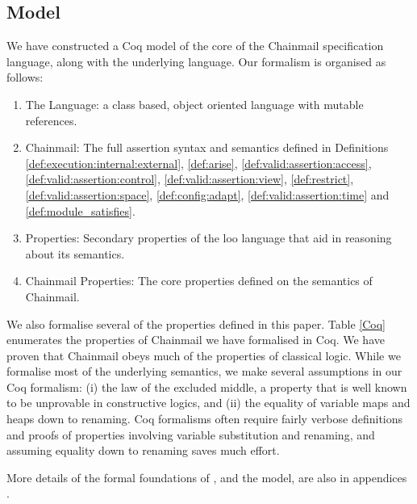 \subsection{Model}


We have constructed a Coq model \cite{examples} of the core of the Chainmail
specification language, along with the underlying \LangOO language.
Our formalism is organised as follows:
\begin{enumerate}
\item
The \LangOO Language: a class based, object oriented language with mutable references.
\item
Chainmail: The full assertion syntax and semantics defined in Definitions \ref{def:execution:internal:external}, \ref{def:arise}, \ref{def:valid:assertion:access}, \ref{def:valid:assertion:control}, \ref{def:valid:assertion:view}, \ref{def:restrict}, \ref{def:valid:assertion:space}, \ref{def:config:adapt}, \ref{def:valid:assertion:time} and \ref{def:module_satisfies}.
\item
\LangOO Properties: Secondary properties of the loo language that aid in reasoning about its semantics.
\item
Chainmail Properties: The core properties defined on the semantics of Chainmail.
\end{enumerate}

We also formalise several of the properties defined in this paper. Table \ref{Coq} enumerates the properties of Chainmail we have formalised in Coq.
We have proven that Chainmail obeys much of the properties of classical logic. While we formalise most of the underlying semantics, we make several assumptions in our Coq formalism: (i) the law of the excluded middle,  a property that is well known to be unprovable in constructive logics, and (ii) the equality of variable maps and heaps down to renaming. Coq formalisms often require fairly verbose definitions and proofs of properties involving variable substitution and renaming, and assuming equality down to renaming saves much effort.

More details of the formal foundations of \Chainmail, and the model,
are also in appendices \cite{examples}.

